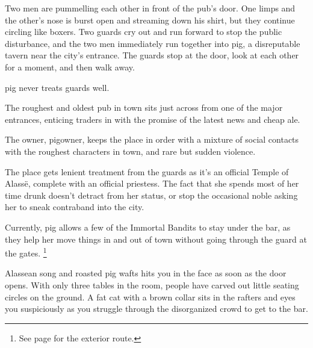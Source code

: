 \begin{multicols}{2}
\begin{boxtext}

  Two men are pummelling each other in front of the pub's door.
   One limps and the other's nose is burst open and streaming down his shirt, but they continue circling like boxers.
   Two guards cry out and run forward to stop the public disturbance, and the two men immediately run together into \gls{pig}, a disreputable tavern near the city's entrance.
   The guards stop at the door, look at each other for a moment, and then walk away.

\Gls{pig} never treats \glspl{guard} well.

\end{boxtext}
 
The roughest and oldest pub in \gls{town} sits just across from one of the major entrances, enticing traders in with the promise of the latest news and cheap ale.

The owner, \gls{pigowner}, keeps the place in order with a mixture of social contacts with the roughest characters in \gls{town}, and rare but sudden violence.

The place gets lenient treatment from the guards as it's an official Temple of Alass\"{e}, complete with an official priestess.
The fact that she spends most of her time drunk doesn't detract from her status, or stop the occasional noble asking her to sneak contraband into the city.

Currently, \gls{pig} allows a few of the Immortal Bandits to stay under the bar, as they help her move things in and out of town without going through the \gls{guard} at the gates.%
\footnote{See page \pageref{farmExit} for the exterior route.}



\begin{boxtext}

  Alassean song and roasted pig wafts hits you in the face as soon as the door opens.
  With only three tables in the room, people have carved out little seating circles on the ground.
  A fat cat with a brown collar sits in the rafters and eyes you suspiciously as you struggle through the disorganized crowd to get to the bar.


\end{boxtext}
\end{multicols}
